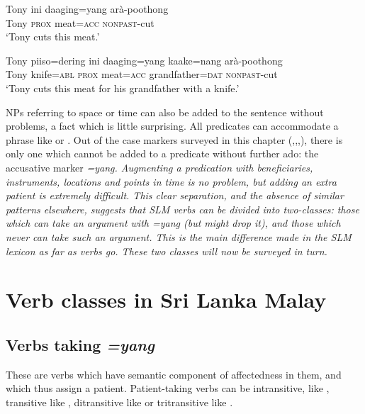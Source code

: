 \documentclass[a4paper,10pt]{article}
\begin{document}
\ea\label{ex:proaddition:plain}
\gll Tony ini daaging=yang arà-poothong \\
     Tony \textsc{prox} meat=\textsc{acc} \textsc{nonpast}-cut\\
    `Tony cuts this meat.'
\z

\ea\label{ex:proaddition:added}
\gll Tony piiso=dering ini daaging=yang   kaake=nang arà-poothong\\
    Tony knife=\textsc{abl} \textsc{prox} meat=\textsc{acc}  grandfather=\textsc{dat} \textsc{nonpast}-cut\\
    `Tony cuts this meat for his grandfather with a knife.'
\z

NPs referring to space or time can also be added to the sentence without problems, a fact which is little surprising. All predicates can accommodate a phrase like  or . Out of the case markers surveyed in this chapter (,,,), there is only one which cannot be added to a predicate without further ado: the accusative marker \em =yang\em. Augmenting a predication with beneficiaries, instruments, locations and points in time is no problem, but adding an extra patient is extremely difficult. This clear separation, and the absence of similar patterns elsewhere, suggests that SLM verbs can be divided into two-classes: those which can take an argument with \em =yang \em (but might drop it), and those which never can take such an argument. This is the main difference made in the SLM lexicon as far as verbs go. These two classes will now be surveyed in turn.

\section{Verb classes in Sri Lanka Malay}
\subsection{Verbs taking \em =yang\em}
These are verbs which have semantic component of affectedness in them, and which thus assign a patient. Patient-taking verbs can be intransitive, like , transitive like , ditransitive like  or tritransitive like .
\end{document}
